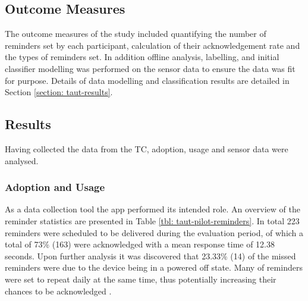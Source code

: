 \subsection{Outcome Measures}
The outcome measures of the study included quantifying the number of reminders set by each participant, calculation of their acknowledgement rate and the types of reminders set. In addition offline analysis, labelling, and initial classifier modelling was performed on the sensor data to ensure the data was fit for purpose. Details of data modelling and classification results are detailed in Section \ref{section: taut-results}.

\subsection{Results}
Having collected the data from the TC, adoption, usage and sensor data were analysed.

\subsubsection{Adoption and Usage}
As a data collection tool the app performed its intended role. An overview of the reminder statistics are presented in Table \ref{tbl: taut-pilot-reminders}. In total 223 reminders were scheduled to be delivered during the evaluation period, of which a total of 73\% (163) were acknowledged with a mean response time of 12.38 seconds. Upon further analysis it was discovered that 23.33\% (14) of the missed reminders were due to the device being in a powered off state. Many of reminders were set to repeat daily at the same time, thus potentially increasing their chances to be acknowledged \cite{Hartin2014-EMBC}.

